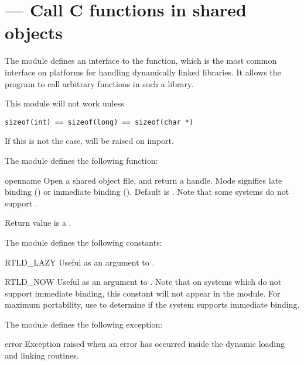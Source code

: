 \section{ ---
         Call C functions in shared objects}

The  module defines an interface to the
 function, which is the most common interface on
\UNIX{} platforms for handling dynamically linked libraries. It allows
the program to call arbitrary functions in such a library.

 This module will not work unless
\begin{verbatim}
sizeof(int) == sizeof(long) == sizeof(char *)
\end{verbatim}
If this is not the case,  will be raised on
import.

The  module defines the following function:

\begin{funcdesc}{open}{name}
Open a shared object file, and return a handle. Mode
signifies late binding () or immediate binding
(). Default is . Note that some
systems do not support .

Return value is a .
\end{funcdesc}

The  module defines the following constants:

\begin{datadesc}{RTLD_LAZY}
Useful as an argument to .
\end{datadesc}

\begin{datadesc}{RTLD_NOW}
Useful as an argument to .  Note that on systems
which do not support immediate binding, this constant will not appear
in the module. For maximum portability, use  to
determine if the system supports immediate binding.
\end{datadesc}

The  module defines the following exception:

\begin{excdesc}{error}
Exception raised when an error has occurred inside the dynamic loading
and linking routines.
\end{excdesc}

